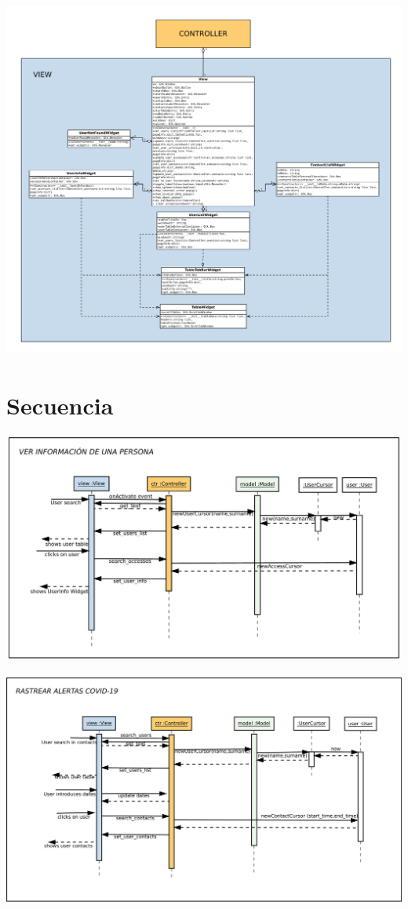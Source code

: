 \documentclass{article}
\begin{document}
\begin{center}
	\includegraphics[height=450px]{view.pdf}
\end{center}

\section{Secuencia}
\bigskip \bigskip

\begin{center}
	\includegraphics[height=287px]{info.pdf}
\end{center}

\begin{center}
	\includegraphics[height=290px]{rastreo.pdf}
\end{center}
\end{document}
